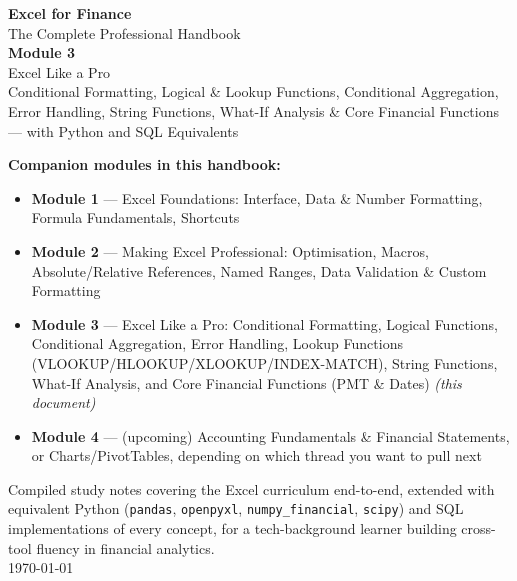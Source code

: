 \documentclass[11pt,a4paper]{article}
\begin{document}
\hypersetup{pageanchor=false}

\begin{titlepage}
\centering
\vspace*{1.2cm}
{\Huge\bfseries\color{excelgreen} Excel for Finance}\\[0.4cm]
{\Large The Complete Professional Handbook}\\[1.0cm]
{\huge\bfseries Module 3}\\[0.3cm]
{\LARGE Excel Like a Pro}\\[0.15cm]
{\large Conditional Formatting, Logical \& Lookup Functions, Conditional Aggregation,\\
Error Handling, String Functions, What-If Analysis \& Core Financial Functions\\[0.1cm]
--- with Python and SQL Equivalents}\\[1.6cm]

\begin{tcolorbox}[colback=excelgreenlight, colframe=excelgreen, width=0.85\textwidth, arc=3pt, before upper=\raggedright]
\textbf{Companion modules in this handbook:}
\begin{itemize}[leftmargin=1.5em]
  \item \textbf{Module 1} --- Excel Foundations: Interface, Data \& Number Formatting, Formula Fundamentals, Shortcuts
  \item \textbf{Module 2} --- Making Excel Professional: Optimisation, Macros, Absolute/Relative References, Named Ranges, Data Validation \& Custom Formatting
  \item \textbf{Module 3} --- Excel Like a Pro: Conditional Formatting, Logical Functions, Conditional Aggregation, Error Handling, Lookup Functions (VLOOKUP/HLOOKUP/XLOOKUP/INDEX-MATCH), String Functions, What-If Analysis, and Core Financial Functions (PMT \& Dates) \textit{(this document)}
  \item \textbf{Module 4} --- (upcoming) Accounting Fundamentals \& Financial Statements, or Charts/PivotTables, depending on which thread you want to pull next
\end{itemize}
\end{tcolorbox}

\vfill
{\small Compiled study notes covering the Excel curriculum end-to-end, extended with equivalent Python (\texttt{pandas}, \texttt{openpyxl}, \texttt{numpy\_financial}, \texttt{scipy}) and SQL implementations of every concept, for a tech-background learner building cross-tool fluency in financial analytics.}\\[0.3cm]
{\small \today}
\end{titlepage}
\end{document}
